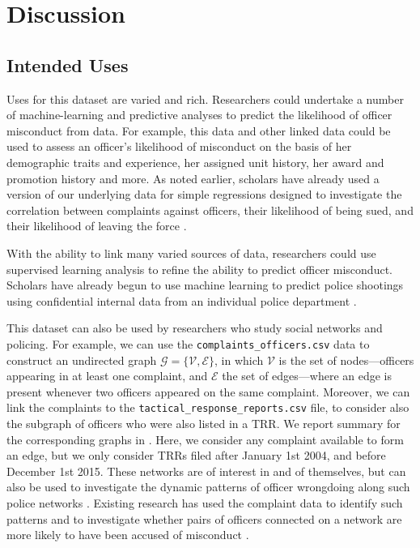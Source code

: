 \section{Discussion} \label{sec:discussion}

\subsection{Intended Uses}
Uses for this dataset are varied and rich. Researchers could undertake a number
of machine-learning and predictive analyses to predict the likelihood of
officer misconduct from data. For example, this data and other linked data
could be used to assess an officer's likelihood of misconduct on the basis of
her demographic traits and experience, her assigned unit history, her award and
promotion history and more. As noted earlier, scholars have already used a
version of our underlying data for simple regressions designed to investigate
the correlation between complaints against officers, their likelihood of being
sued, and their likelihood of leaving the force \cite{Rozema19}. 

With the ability to link many varied sources of data, researchers could use
supervised learning analysis to refine the ability to predict officer
misconduct. Scholars have already begun to use machine learning to predict
police shootings using confidential internal data from an individual police
department \cite{Helsby18}.

This dataset can also be used by researchers who study social networks and
policing. 
For example, we can use the \texttt{complaints\_officers.csv} data to construct an
undirected graph $\mathcal{G} = \{\mathcal{V}, \mathcal{E}\}$, in which
$\mathcal{V}$ is the set of nodes---officers appearing in at least one
complaint, and $\mathcal{E}$ the set of edges---where an edge is present
whenever two officers appeared on the same complaint. Moreover, we can link the
complaints to the \texttt{tactical\_response\_reports.csv} file, to consider
also the subgraph of officers who were also listed in a TRR. We report summary
for the corresponding graphs in . Here, we consider any
complaint available to form an edge, but we only consider TRRs filed after
January 1st 2004, and before December 1st 2015.
These networks are of interest in and of
themselves, but can also be used to investigate the dynamic patterns of officer
wrongdoing along such police networks \cite{Roithmayr16}. Existing research has used the complaint
data to identify such patterns and to investigate whether pairs of officers
connected on a network are more likely to have been accused of misconduct \cite{Ouellet19}.

